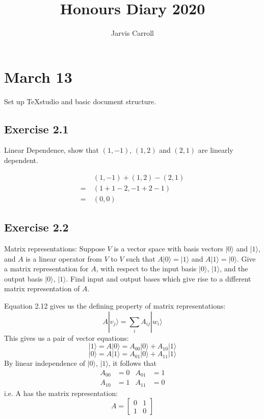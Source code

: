 \documentclass[]{article}
\title{Honours Diary 2020}
\author{Jarvis Carroll}
\begin{document}
\maketitle

\section{March 13}

Set up TeXstudio and basic document structure.

\subsection{Exercise 2.1}
Linear Dependence, show that $(1,-1)$, $(1,2)$ and $(2,1)$ are linearly dependent.

\begin{align*}
	&(1, -1) + (1, 2) - (2, 1) \\
=\ &(1+1-2, -1+2-1) \\
=\ &(0, 0)
\end{align*}

\subsection{Exercise 2.2}
Matrix representations: Suppose $V$ is a vector space with basis vectors $|0\rangle$ and $|1\rangle$, and $A$ is a linear operator from $V$ to $V$ such that $A|0\rangle=|1\rangle$ and $A|1\rangle=|0\rangle$. Give a matrix representation for $A$, with respect to the input basis $|0\rangle$, $|1\rangle$, and the output basis $|0\rangle$, $|1\rangle$. Find input and output bases which give rise to a different matrix representation of $A$.

Equation 2.12 gives us the defining property of matrix representations:
\[A|v_j\rangle=\sum_i A_{ij}|w_i\rangle\]
This gives us a pair of vector equations:
\[
|1\rangle = A|0\rangle = A_{00}|0\rangle + A_{10}|1\rangle
\]
\[
|0\rangle = A|1\rangle = A_{01}|0\rangle + A_{11}|1\rangle
\]
By linear independence of $|0\rangle$, $|1\rangle$, it follows that
\begin{align*}
A_{00} &= 0 & A_{01} &= 1 \\
A_{10} &= 1 & A_{11} &= 0
\end{align*}
i.e. A has the matrix representation:
\[
A = \left[\begin{matrix}
0 & 1 \\
1 & 0
\end{matrix}\right]
\]
\end{document}
